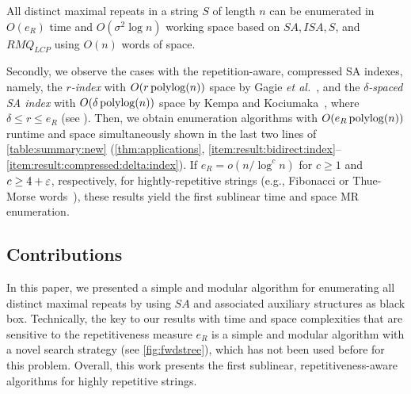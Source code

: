 \begin{theorem}\label{thm:algo:uncompressed:sa}
  All distinct maximal repeats in a string $S$ of length $n$ can be enumerated in $O(e_R)$ time and $O(\sigma^2 \log n)$ working space based on $SA, ISA, S$, and $RMQ_{LCP}$ using $O(n)$ words of space. 
\end{theorem}

Secondly, we observe the cases with the repetition-aware, compressed SA indexes, namely,
the \textit{$r$-index} with $O(r\operatorname{\mathrm{polylog}}(n))$ space by Gagie \textit{et al.}~\cite{gagie:navarro:prezza2020fully}, and
the \textit{$\delta$-spaced SA index} with $O(\delta\operatorname{\mathrm{polylog}}(n))$ space by Kempa and Kociumaka~\cite{kempa:kociumaka2023collapsing}, where $\delta \le r \le e_R$ (see \cite{kociumaka:navarro:olivares2024near:delta:optimal,kempa2018roots,belazzougui:cunial:gagie:prezza:raffinot2015composite}).
Then, we obtain enumeration algorithms with $O(e_R\operatorname{\mathrm{polylog}}(n))$ runtime and space simultaneously shown in the last two lines of \cref{table:summary:new} (\cref{thm:applications}, \ref{item:result:bidirect:index}--\ref{item:result:compressed:delta:index}). 
If $e_R = o(n/\log^c n)$ for $c\ge 1$ and $c\ge 4+\varepsilon$, respectively, for hightly-repetitive strings (e.g., Fibonacci or Thue-Morse words~\cite{radoszewski:rytter2012structure:cdawg:thuemorse}), these results yield the first sublinear time and space MR enumeration. 


\subsection{Contributions} 
In this paper, we presented a simple and modular algorithm for enumerating all distinct maximal repeats by using $SA$ and associated auxiliary structures as black box.
Technically, the key to our results with time and space complexities that are  sensitive to the repetitiveness measure $e_R$ is a simple and modular algorithm with a novel search strategy (see \cref{fig:fwdstree}), which has not been used before for this problem. 
Overall, this work presents the first sublinear, repetitiveness-aware algorithms for highly repetitive strings.


